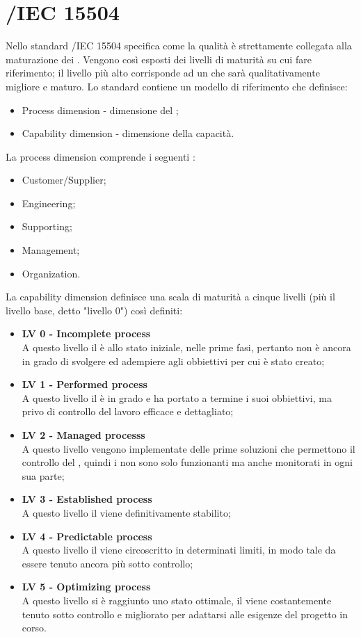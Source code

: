 \section{/IEC 15504 }
Nello standard /IEC 15504 specifica come la qualità è strettamente collegata alla maturazione dei . Vengono così esposti dei livelli di maturità su cui fare riferimento; il livello più alto corrisponde ad un  che sarà qualitativamente migliore e maturo.
Lo standard contiene un modello di riferimento che definisce:
\begin{itemize}
	\item Process dimension - dimensione del ;
	\item Capability dimension - dimensione della capacità.
\end{itemize}
La process dimension comprende i seguenti :
\begin{itemize}
	\item Customer/Supplier;
	\item Engineering;
	\item Supporting;
	\item Management;
	\item Organization.
\end{itemize}
La capability dimension definisce una scala di maturità a cinque livelli (più il livello base, detto "livello 0") così definiti:
\begin{itemize}
	\item \textbf{LV 0 - Incomplete process}\\ A questo livello il  è allo stato iniziale, nelle prime fasi, pertanto non è ancora in grado di svolgere ed adempiere agli obbiettivi per cui è stato creato;
	\item \textbf{LV 1 - Performed process}\\ A questo livello il  è in grado e ha portato a termine i suoi obbiettivi, ma privo di controllo del lavoro efficace e dettagliato;
	\item \textbf{LV 2 - Managed processs}\\ A questo livello vengono implementate delle prime soluzioni che permettono il controllo del , quindi i  non sono solo funzionanti ma anche monitorati in ogni sua parte;
	\item \textbf{LV 3 - Established process}\\ A questo livello il  viene definitivamente stabilito;
	\item \textbf{LV 4 - Predictable process}\\ A questo livello il  viene circoscritto in determinati limiti, in modo tale da essere tenuto ancora più sotto controllo;
	\item \textbf{LV 5 - Optimizing process}\\ A questo livello si è raggiunto uno stato ottimale, il  viene costantemente tenuto sotto controllo e migliorato per adattarsi alle esigenze del progetto in corso.
\end{itemize}

